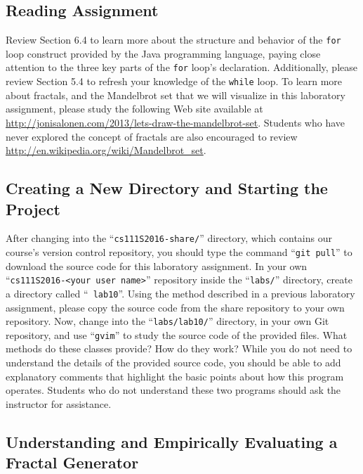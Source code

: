 \subsection*{Reading Assignment}
\vspace{-0.05in}

Review Section 6.4 to learn more about the structure and behavior of the {\tt for} loop construct provided by the Java
programming language, paying close attention to the three key parts of the {\tt for} loop's declaration.  Additionally,
please review Section 5.4 to refresh your knowledge of the {\tt while} loop. To learn more about fractals, and the
Mandelbrot set that we will visualize in this laboratory assignment, please study the following Web site available at
\url{http://jonisalonen.com/2013/lets-draw-the-mandelbrot-set}.  Students who have never explored the concept of
fractals are also encouraged to review \url{http://en.wikipedia.org/wiki/Mandelbrot_set}.

\vspace{-0.1in}
\subsection*{Creating a New Directory and Starting the Project}
\vspace{-0.05in}

After changing into the ``{\tt cs111S2016-share/}'' directory, which contains our course's version control repository,
you should type the command ``{\tt git pull}'' to download the source code for this laboratory assignment.  In your own
``{\tt cs111S2016-<your user name>}'' repository inside the ``{\tt labs/}'' directory, create a directory called ``{\tt
  lab10}''. Using the method described in a previous laboratory assignment, please copy the source code from the share
repository to your own repository. Now, change into the ``{\tt labs/lab10/}'' directory, in your own Git repository, and
use ``{\tt gvim}'' to study the source code of the provided files. What methods do these classes provide? How do they
work? While you do not need to understand the details of the provided source code, you should be able to add explanatory
comments that highlight the basic points about how this program operates. Students who do not understand these two programs
should ask the instructor for assistance.

\vspace{-0.1in}
\subsection*{Understanding and Empirically Evaluating a Fractal Generator}
\vspace{-0.05in}

